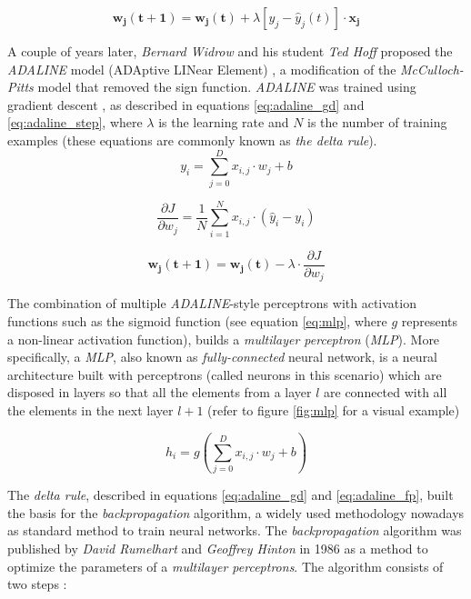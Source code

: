 \begin{equation}
\label{eq:rosenblatt}
\mathbf{w_j(t+1)} = \mathbf{w_j(t)} + \lambda [ y_j-\hat{y}_j(t) ] \cdot \mathbf{x_j}
\end{equation}

 A couple of years later, \textit{Bernard Widrow} and his student \textit{Ted Hoff} proposed the \textit{ADALINE} model (ADAptive LINear Element) \autocite{widrow1960}, a modification of the \textit{McCulloch-Pitts} model that removed the sign function. \textit{ADALINE} was trained using gradient descent \autocite{fredric2000}, as described in equations \ref{eq:adaline_gd} and \ref{eq:adaline_step}, where $\lambda$ is the learning rate and $N$ is the number of training examples (these equations are commonly known as \textit{the delta rule}).
\begin{equation}
\label{eq:adaline_fp}
y_i = \sum_{j=0}^{D} x_{i,j} \cdot w_{j} + b
\end{equation}

\begin{equation}
\label{eq:adaline_gd}
\frac{\partial J}{\partial{w_j}} = \frac{1}{N} \sum_{i=1}^{N} x_{i,j} \cdot(\hat{y}_i - y_i)
\end{equation}

\begin{equation}
\label{eq:adaline_step}
\mathbf{w_j(t+1)} = \mathbf{w_j(t)} - \lambda \cdot \frac{\partial J}{\partial {w_j}}
\end{equation}


 The combination of multiple \textit{ADALINE}-style perceptrons with activation functions such as the sigmoid function (see equation \ref{eq:mlp}, where $g$ represents a non-linear activation function), builds a \textit{multilayer perceptron} (\textit{MLP}). More specifically, a \textit{MLP}, also known as \textit{fully-connected} neural network, is a neural architecture built with perceptrons (called neurons in this scenario) which are disposed in layers so that all the elements from a layer $l$ are connected with all the elements in the next layer $l+1$ (refer to figure \ref{fig:mlp} for a visual example)


 \begin{equation}
 \label{eq:mlp}
 h_i = g\left(\sum_{j=0}^{D} x_{i,j} \cdot w_{j} + b\right)
 \end{equation}

 The \textit{delta rule}, described in equations \ref{eq:adaline_gd} and \ref{eq:adaline_fp}, built the basis for the \textit{backpropagation} algorithm, a widely used methodology nowadays as standard method to train neural networks. The \textit{backpropagation} algorithm \autocite{hinton1986} was published by \textit{David Rumelhart} and \textit{Geoffrey Hinton} in 1986 as a method to optimize the parameters of a \textit{multilayer perceptrons}. The algorithm consists of two steps \autocite{haykin1998}:

